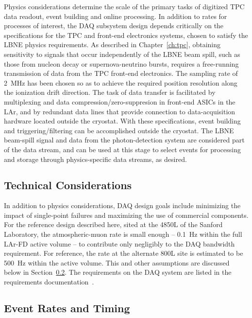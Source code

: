 Physics considerations determine the scale of the primary 
tasks of digitized TPC data readout, event building and online processing. 
In addition to rates for processes of interest, the DAQ subsystem design 
depends critically on the specifications for the TPC and front-end 
electronics systems, chosen to satisfy the LBNE physics requirements.  
As described in Chapter~\ref{ch:tpc}, obtaining sensitivity to 
signals that occur independently of the LBNE beam spill, 
such as those from nucleon decay or supernova-neutrino bursts, 
requires a free-running transmission of data from the TPC front-end 
electronics.  The sampling rate of 2~MHz has been chosen so as to 
achieve the required position resolution along the ionization drift 
direction.  
The task of data transfer is facilitated by multiplexing and 
data compression/zero-suppresion in front-end ASICs in the LAr, 
and by redundant data lines that provide connection to data-acquisition 
hardware located outside the cryostat.  With these specifications, 
event building and triggering/filtering can be accomplished outside the 
cryostat.  The LBNE beam-spill signal and data from the photon-detection 
system are considered part of the 
data stream, and can be used at this stage to select events for processing 
and storage through physics-specific data streams, as desired.

\subsection{Technical Considerations}
In addition to physics considerations, DAQ design goals include  
minimizing the impact of single-point failures and maximizing 
the use of commercial components.  
For the reference design described here, sited at the 4850L of the Sanford Laboratory, the 
atmospheric-muon rate is small enough -- 0.1~Hz within the full LAr-FD active 
volume -- to contribute only negligibly to the DAQ bandwidth requirement.
For reference, the rate at the alternate 800L site 
is estimated to be 500~Hz within the active volume.  
This and other assumptions are discussed below in 
Section~\ref{sec:v5-daq-assumptions}.  The requirements on the DAQ system are listed in the
requirements documentation~\cite{lar-fd-req}.





\subsection{Event Rates and Timing}
\label{sec:v5-daq-assumptions}

